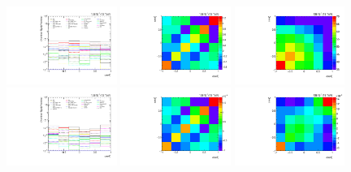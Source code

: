 \clearpage
\begin{figure}[htb]
\begin{center}
 \includegraphics[width=0.32\textwidth]{fig_fullRun2UL/unfolding/combined/deltaSystCombinedlog_rebinnedB_b1k.pdf}
 \includegraphics[width=0.32\textwidth]{fig_fullRun2UL/unfolding/combined/StatCovMatrix_rebinnedB_b1k.pdf}
 \includegraphics[width=0.32\textwidth]{fig_fullRun2UL/unfolding/combined/TotalSystCovMatrix_rebinnedB_b1k.pdf} \\
 \includegraphics[width=0.32\textwidth]{fig_fullRun2UL/unfolding/combined/deltaSystCombinedlogNorm_rebinnedB_b1k.pdf}
 \includegraphics[width=0.32\textwidth]{fig_fullRun2UL/unfolding/combined/StatCovMatrixNorm_rebinnedB_b1k.pdf}
 \includegraphics[width=0.32\textwidth]{fig_fullRun2UL/unfolding/combined/TotalSystCovMatrixNorm_rebinnedB_b1k.pdf} \\

\end{center}
\end{figure}
